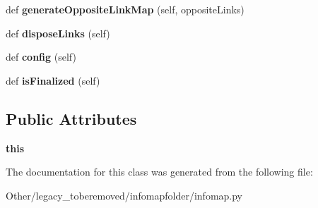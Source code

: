 \begin{DoxyCompactItemize}
\item 
\mbox{\label{classinfomapfolder_1_1infomap_1_1Network_a8f78f591b8d8aa253121df59b12a5ad2}} 
def {\bfseries generate\+Opposite\+Link\+Map} (self, opposite\+Links)
\item 
\mbox{\label{classinfomapfolder_1_1infomap_1_1Network_a9b6f102c863474bb897041b51e9d4150}} 
def {\bfseries dispose\+Links} (self)
\item 
\mbox{\label{classinfomapfolder_1_1infomap_1_1Network_a4d38ae5adbacf19ef92d00a48a5d3577}} 
def {\bfseries config} (self)
\item 
\mbox{\label{classinfomapfolder_1_1infomap_1_1Network_a78d681a4d624607edc7b770e1dd8aef3}} 
def {\bfseries is\+Finalized} (self)
\end{DoxyCompactItemize}
\subsection*{Public Attributes}
\begin{DoxyCompactItemize}
\item 
\mbox{\label{classinfomapfolder_1_1infomap_1_1Network_ab4650bbfb9d82e4a627115a96b138a1a}} 
{\bfseries this}
\end{DoxyCompactItemize}


The documentation for this class was generated from the following file\+:\begin{DoxyCompactItemize}
\item 
Other/legacy\+\_\+toberemoved/infomapfolder/infomap.\+py\end{DoxyCompactItemize}
